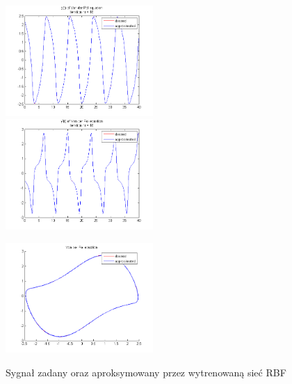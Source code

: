 \begin{figure}[ht!]
	\centering

	\subfloat
	{\includegraphics[width=0.5\textwidth]
	{images/signal_approx.png}}
	\subfloat
	{\includegraphics[width=0.5\textwidth]
	{images/deriv_approx.png}}	
	
	\subfloat
	{\includegraphics[width=0.5\textwidth]
	{images/trajectory_approx.png}}

	\caption{Sygnał zadany oraz aproksymowany przez wytrenowaną sieć RBF}
	\label{img:approximated}
\end{figure}


